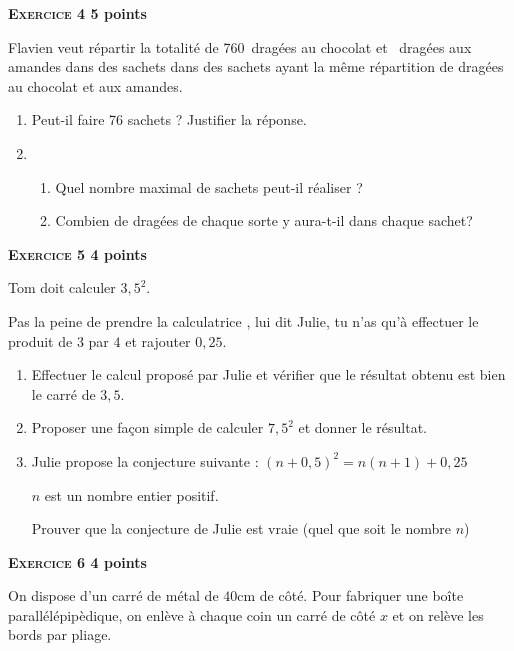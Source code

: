\documentclass[10pt]{article}
\begin{document}
\bigskip

\textbf{\textsc{Exercice 4} \hfill 5 points}

\medskip

Flavien veut répartir la totalité de 760~dragées au chocolat et ~dragées aux amandes dans des sachets dans des sachets ayant la même répartition de dragées au chocolat et aux amandes.

\medskip
 
\begin{enumerate}
\item Peut-il faire 76 sachets ? Justifier la réponse. 
\item 
	\begin{enumerate}
		\item Quel nombre maximal de sachets peut-il réaliser ? 
		\item Combien de dragées de chaque sorte y aura-t-il dans chaque sachet?
	\end{enumerate}
\end{enumerate}
 
\vspace{0,5cm}

\textbf{\textsc{Exercice 5} \hfill 4 points}

\bigskip
 
Tom doit calculer $3,5^2$.
 
\og Pas la peine de prendre la calculatrice \fg, lui dit Julie, tu n'as qu'à effectuer le produit de $3$ par $4$ et rajouter $0,25$. 

\medskip

\begin{enumerate}
\item Effectuer le calcul proposé par Julie et vérifier que le résultat obtenu est bien le carré de $3,5$. 
\item Proposer une façon simple de calculer $7,5^2$ et donner le résultat. 
\item Julie propose la conjecture suivante : 	$(n + 0,5)^2 = n(n + 1) + 0,25$ 

$n$ est un nombre entier positif. 

Prouver que la conjecture de Julie est vraie (quel que soit le nombre $n$) 
\end{enumerate} 

\bigskip

\textbf{\textsc{Exercice 6} \hfill 4 points}

\medskip
 
On dispose d'un carré de métal de $40$cm de côté. Pour fabriquer une boîte parallélépipèdique, on enlève à chaque coin un carré de côté $x$ et on relève les bords par pliage.
\end{document}
